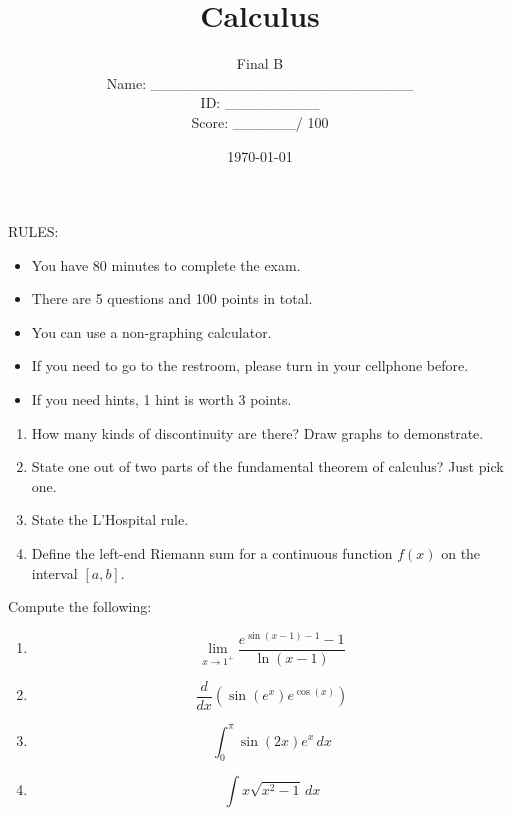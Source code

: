 \documentclass[12pt]{amsart}
\title{ Calculus }
\author{  Final B \\ \vspace{1cm} Name: \_\_\_\_\_\_\_\_\_\_\_\_\_\_\_\_\_\_\_\_\_\_\_\_\_  
\\ \vspace{1cm} ID: \_\_\_\_\_\_\_\_\_ \\ \vspace{1cm} Score: \_\_\_\_\_\_/ 100}
\date{\today}
\begin{document}
\maketitle


RULES:
\begin{itemize}
	\item You have 80 minutes to complete the exam.
	\item There are 5 questions and 100 points in total.
	\item You can use a non-graphing calculator.
	\item If you need to go to the restroom, please turn in your cellphone before.
	\item If you need hints, 1 hint is worth 3 points.
\end{itemize}

\newpage

\begin{problem}[20 points]
\begin{enumerate}
	\item How many kinds of discontinuity are there? Draw graphs to demonstrate.
	      \vspace{11cm}

	\item State one out of two parts of the fundamental theorem of calculus? Just pick one.
	      \vspace{11cm}

	      \newpage
	\item State the L'Hospital rule.
	      \vspace{11cm}

	\item Define the left-end Riemann sum for a continuous function $f(x)$ on the interval $[a,b]$.
	      \vspace{11cm}
\end{enumerate}
\end{problem}

\newpage

\begin{problem}[20 points]
Compute the following:

\begin{enumerate}
	\item $$ \lim_{x \to 1^+} \frac{ e^{\sin(x-1)-1} - 1}{\ln(x-1)} $$
	      \vspace{8cm}
	\item $$ \frac{d}{dx} \left( \sin (e^x) e^{\cos (x)}  \right)$$
	      \vspace{8cm}
	\item $$ \int_0^\pi \sin(2x) e^x \, dx $$
	      \vspace{8cm}

	\item $$\int  x\sqrt{x^2-1} \, dx $$
	      \vspace{8cm}

\end{enumerate}
\end{problem}
\end{document}
